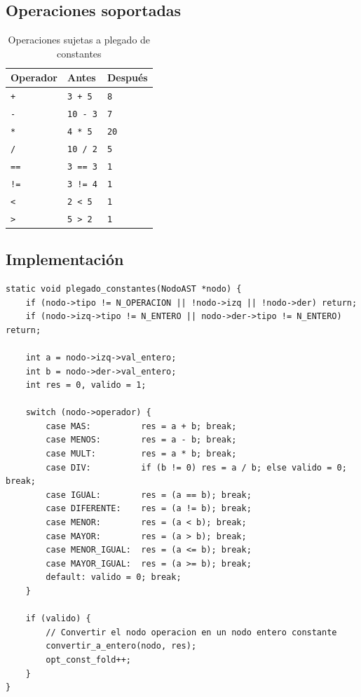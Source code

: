 \subsection{Operaciones soportadas}

\begin{table}[H]
\centering
\begin{tabular}{lll}
\toprule
\textbf{Operador} & \textbf{Antes} & \textbf{Después} \\
\midrule
\texttt{+} & \texttt{3 + 5} & \texttt{8} \\
\texttt{-} & \texttt{10 - 3} & \texttt{7} \\
\texttt{*} & \texttt{4 * 5} & \texttt{20} \\
\texttt{/} & \texttt{10 / 2} & \texttt{5} \\
\texttt{==} & \texttt{3 == 3} & \texttt{1} \\
\texttt{!=} & \texttt{3 != 4} & \texttt{1} \\
\texttt{<} & \texttt{2 < 5} & \texttt{1} \\
\texttt{>} & \texttt{5 > 2} & \texttt{1} \\
\bottomrule
\end{tabular}
\caption{Operaciones sujetas a plegado de constantes}
\label{tab:const-fold}
\end{table}

\subsection{Implementación}

\begin{lstlisting}[style=cstyle, caption={Implementación del plegado de constantes en opt.c}]
static void plegado_constantes(NodoAST *nodo) {
    if (nodo->tipo != N_OPERACION || !nodo->izq || !nodo->der) return;
    if (nodo->izq->tipo != N_ENTERO || nodo->der->tipo != N_ENTERO) return;

    int a = nodo->izq->val_entero;
    int b = nodo->der->val_entero;
    int res = 0, valido = 1;

    switch (nodo->operador) {
        case MAS:          res = a + b; break;
        case MENOS:        res = a - b; break;
        case MULT:         res = a * b; break;
        case DIV:          if (b != 0) res = a / b; else valido = 0; break;
        case IGUAL:        res = (a == b); break;
        case DIFERENTE:    res = (a != b); break;
        case MENOR:        res = (a < b); break;
        case MAYOR:        res = (a > b); break;
        case MENOR_IGUAL:  res = (a <= b); break;
        case MAYOR_IGUAL:  res = (a >= b); break;
        default: valido = 0; break;
    }

    if (valido) {
        // Convertir el nodo operacion en un nodo entero constante
        convertir_a_entero(nodo, res);
        opt_const_fold++;
    }
}
\end{lstlisting}

